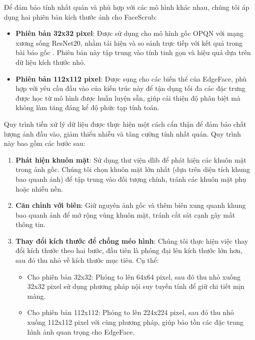 Để đảm bảo tính nhất quán và phù hợp với các mô hình khác nhau, chúng tôi áp dụng hai phiên bản kích thước ảnh cho FaceScrub:
\begin{itemize}
    \item \textbf{Phiên bản 32x32 pixel}: Được sử dụng cho mô hình gốc OPQN với mạng xương sống ResNet20, nhằm tái hiện và so sánh trực tiếp với kết quả trong bài báo gốc \cite{opqn}. Phiên bản này tập trung vào tính tinh gọn và hiệu quả dựa trên dữ liệu kích thước nhỏ.
    \item \textbf{Phiên bản 112x112 pixel}: Được sụng cho các biến thể của EdgeFace, phù hợp với yêu cầu đầu vào của kiến trúc này để tận dụng tối đa các đặc trưng được học từ mô hình được huấn luyện sẵn, giúp cải thiện độ phân biệt mà không làm tăng đáng kể độ phức tạp tính toán.
\end{itemize}

Quy trình tiền xử lý dữ liệu được thực hiện một cách cẩn thận để đảm bảo chất lượng ảnh đầu vào, giảm thiểu nhiễu và tăng cường tính nhất quán. Quy trình này bao gồm các bước sau:

\begin{enumerate}
    \item \textbf{Phát hiện khuôn mặt}: Sử dụng thư viện dlib để phát hiện các khuôn mặt trong ảnh gốc. Chúng tôi chọn khuôn mặt lớn nhất (dựa trên diện tích khung bao quanh ảnh) để tập trung vào đối tượng chính, tránh các khuôn mặt phụ hoặc nhiễu nền.
    \item \textbf{Căn chỉnh với biên}: Giữ nguyên ảnh gốc và thêm biên xung quanh khung bao quanh ảnh để mở rộng vùng khuôn mặt, tránh cắt sát cạnh gây mất thông tin. 
    \item \textbf{Thay đổi kích thước để chống méo hình}: Chúng tôi thực hiện việc thay đổi kích thước theo hai bước, đầu tiên là phóng đại lên kích thước lớn hơn, sau đó thu nhỏ về kích thước mục tiêu. Cụ thể:
    \begin{itemize}
        \item Cho phiên bản 32x32: Phóng to lên 64x64 pixel, sau đó thu nhỏ xuống 32x32 pixel sử dụng phương pháp nội suy tuyến tính để giữ chi tiết mịn màng.
        \item Cho phiên bản 112x112: Phóng to lên 224x224 pixel, sau đó thu nhỏ xuống 112x112 pixel với cùng phương pháp, giúp bảo tồn các đặc trung hình ảnh quan trọng cho EdgeFace.
    \end{itemize}
\end{enumerate}

